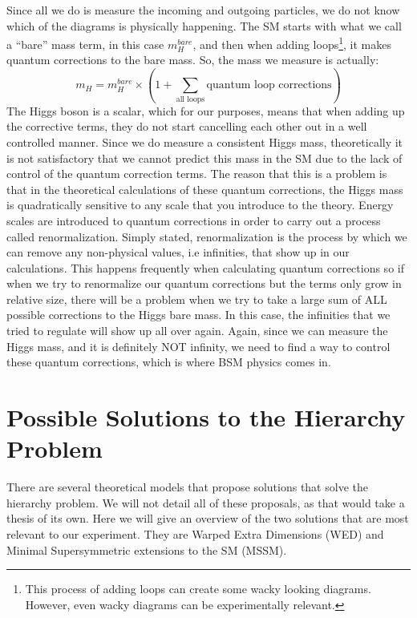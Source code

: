 Since all we do is measure the incoming and outgoing particles, we do not know which of the diagrams is physically happening. 
The SM starts with what we call a ``bare'' mass term, in this case $m_H^{bare}$, and then when adding loops\footnote{This process of adding loops can create some wacky looking diagrams. However, even wacky diagrams can be experimentally relevant.}, it makes quantum corrections to the bare mass.
So, the mass we measure is actually:
\begin{equation}
    m_H = m_H^{bare} \times ( 1 + \sum_{\text{all loops}} \text{quantum loop corrections} ) 
    \label{eq:eq_bareMH}
\end{equation}
The Higgs boson is a scalar, which for our purposes, means that when adding up the corrective terms, they do not start cancelling each other out in a well controlled manner.
Since we do measure a consistent Higgs mass, theoretically it is not satisfactory that we cannot predict this mass in the SM due to the lack of control of the quantum correction terms.
The reason that this is a problem is that in the theoretical calculations of these quantum corrections, the Higgs mass is quadratically sensitive to any scale that you introduce to the theory.
Energy scales are introduced to quantum corrections in order to carry out a process called renormalization. Simply stated, renormalization is the process by which we can remove any non-physical values, i.e infinities, that show up in our calculations.
This happens frequently when calculating quantum corrections so if when we try to renormalize our quantum corrections but the terms only grow in relative size, there will be a problem when we try to take a large sum of ALL possible corrections to the Higgs bare mass.
In this case, the infinities that we tried to regulate will show up all over again. Again, since we can measure the Higgs mass, and it is definitely NOT infinity, we need to find a way to control these quantum corrections, which is where BSM physics comes in.
\section{Possible Solutions to the Hierarchy Problem}

There are several theoretical models that propose solutions that solve the hierarchy problem. We will not detail all of these proposals, as that would take a thesis of its own. 
Here we will give an overview of the two solutions that are most relevant to our experiment. They are Warped Extra Dimensions (WED) and Minimal Supersymmetric extensions to the SM (MSSM).

